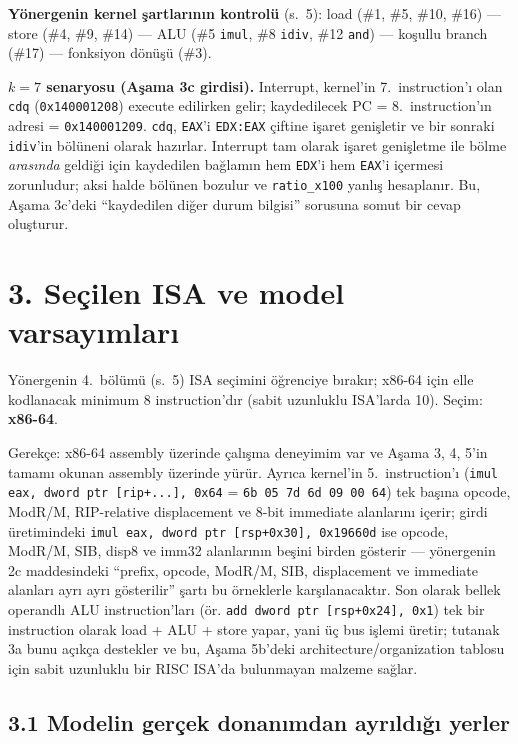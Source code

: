 \documentclass[11pt,a4paper]{article}
\newcommand{\tl}{\texttt}
\begin{document}
\textbf{Yönergenin kernel şartlarının kontrolü} (s.~5):
load \checkmark (\#1, \#5, \#10, \#16) --- store \checkmark (\#4, \#9, \#14) ---
ALU \checkmark (\#5 \tl{imul}, \#8 \tl{idiv}, \#12 \tl{and}) ---
koşullu branch \checkmark (\#17) --- fonksiyon dönüşü \checkmark (\#3).

\textbf{$k = 7$ senaryosu (Aşama 3c girdisi).} Interrupt, kernel'in 7.~instruction'ı olan
\tl{cdq} (\tl{0x140001208}) execute edilirken gelir; kaydedilecek PC = 8.~instruction'ın adresi =
\tl{0x140001209}. \tl{cdq}, \tl{EAX}'i \tl{EDX:EAX} çiftine işaret genişletir ve bir sonraki
\tl{idiv}'in bölüneni olarak hazırlar. Interrupt tam olarak işaret genişletme ile bölme
\textit{arasında} geldiği için kaydedilen bağlamın hem \tl{EDX}'i hem \tl{EAX}'i içermesi
zorunludur; aksi halde bölünen bozulur ve \tl{ratio\_x100} yanlış hesaplanır. Bu, Aşama 3c'deki
``kaydedilen diğer durum bilgisi'' sorusuna somut bir cevap oluşturur.

\section*{3. Seçilen ISA ve model varsayımları}

Yönergenin 4.~bölümü (s.~5) ISA seçimini öğrenciye bırakır; x86-64 için elle kodlanacak minimum
8 instruction'dır (sabit uzunluklu ISA'larda 10). Seçim: \textbf{x86-64}.

Gerekçe: x86-64 assembly üzerinde çalışma deneyimim var ve Aşama 3, 4, 5'in tamamı okunan assembly
üzerinde yürür. Ayrıca kernel'in 5.~instruction'ı
(\tl{imul eax, dword ptr [rip+...], 0x64} = \tl{6b 05 7d 6d 09 00 64}) tek başına opcode, ModR/M,
RIP-relative displacement ve 8-bit immediate alanlarını içerir; girdi üretimindeki
\tl{imul eax, dword ptr [rsp+0x30], 0x19660d} ise opcode, ModR/M, SIB, disp8 ve imm32 alanlarının
beşini birden gösterir --- yönergenin 2c maddesindeki ``prefix, opcode, ModR/M, SIB, displacement
ve immediate alanları ayrı ayrı gösterilir'' şartı bu örneklerle karşılanacaktır. Son olarak
bellek operandlı ALU instruction'ları (ör. \tl{add dword ptr [rsp+0x24], 0x1}) tek bir
instruction olarak load + ALU + store yapar, yani üç bus işlemi üretir; tutanak 3a bunu açıkça
destekler ve bu, Aşama 5b'deki architecture/organization tablosu için sabit uzunluklu bir RISC
ISA'da bulunmayan malzeme sağlar.

\subsection*{3.1 Modelin gerçek donanımdan ayrıldığı yerler}
\end{document}
